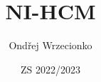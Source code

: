 \documentclass{article}
\title{NI-HCM}
\author{Ondřej Wrzecionko}
\date{ZS 2022/2023}
\begin{document}
\maketitle

\renewcommand{\contentsname}{Obsah}
\tableofcontents






\end{document}
